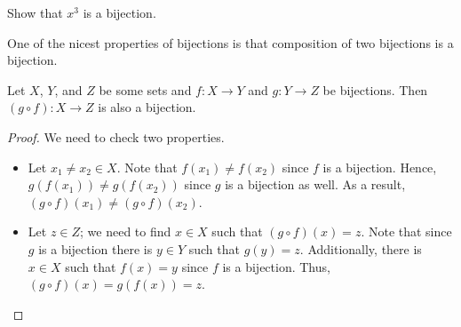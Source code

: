 \begin{exercise}
    Show that $x^3$ is a bijection.
\end{exercise}

One of the nicest properties of bijections is that composition of two bijections
is a bijection.
\begin{theorem}
\label{theorem:bijections-composition}
    Let $X$, $Y$, and $Z$ be some sets and $f : X \to Y$ and $g : Y \to Z$ be
    bijections. Then $(g \circ f) : X \to Z$ is also a bijection.
\end{theorem}
\begin{proof}
    We need to check two properties.
    \begin{itemize}
        \item Let $x_1 \neq x_2 \in X$. Note that $f(x_1) \neq f(x_2)$ since $f$
            is a bijection. Hence, $g(f(x_1)) \neq g(f(x_2))$ since $g$ is a bijection
            as well. As a result, $(g \circ f)(x_1) \neq (g \circ f)(x_2)$.
        \item Let $z \in Z$; we need to find $x \in X$ such that
            $(g \circ f)(x) = z$. Note that since $g$ is a bijection there is
            $y \in Y$ such that $g(y) = z$. Additionally, there is $x \in X$ such
            that $f(x) = y$ since $f$ is a bijection. Thus,
            $(g \circ f)(x) = g(f(x)) = z$.
    \end{itemize}
\end{proof}

